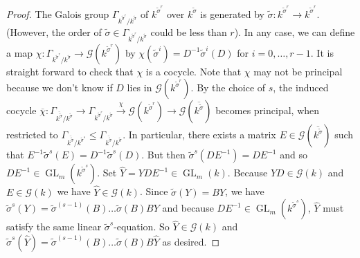 \documentclass[oneside,reqno]{amsart}
\theoremstyle{definition}
\newcommand{\G}{\mathcal{G}}
\newcommand{\Gl}{\operatorname{GL}}
\newcommand{\s}{\sigma}
\begin{document}
\begin{proof}
The Galois group %
$\Gamma_{k^{{\tilde\s}^r}/k^{\tilde\s}}$ of $k^{{\tilde \s}^r}$ over $ k^{\tilde \s}$ is generated by $\tilde{\s}\colon k^{{\tilde \s}^r}\to k^{{\tilde \s}^r}$. (However, the order of $\tilde{\s}\in \Gamma_{k^{{\tilde\s}^r}/k^{\tilde\s}}$ could be less than $r$). In any case, we can define a map $\chi\colon \Gamma_{k^{{\tilde\s}^r}/k^{\tilde\s}}\to \G( k^{\tilde \s^r})$ by $\chi(\tilde \s^i)=D^{-1}\tilde \s^i(D)$ for $i=0,\ldots,{r-1}$. It is straight forward to check that $\chi$ is a cocycle. Note that $\chi$ may not be principal because we don't know if $D$ lies in $\G( k^{\tilde \s^r})$. By the choice of $s$, the induced cocycle $\overline{\chi}\colon \Gamma_{\overline{k^{{\tilde\s}}}/k^{\tilde\s}}\to \Gamma_{k^{{\tilde\s}^r}/k^{\tilde\s}}\xrightarrow{\chi} \G( k^{\tilde \s^r})\to  \G(\overline{k^{\tilde \s}})$ becomes principal, when restricted to $\Gamma_{\overline{k^{{\tilde\s}}}/k^{\tilde\s^s}}\leq\Gamma_{\overline{k^{{\tilde\s}}}/k^{\tilde\s}}$. In particular, there exists a matrix $E\in \G(\overline{k^{\tilde \s}})$ such that $E^{-1}\tilde\s^s(E)=D^{-1}\tilde\s^s(D)$. But then $\tilde\s^s(DE^{-1})=DE^{-1}$ and so $DE^{-1}\in\Gl_m(k^{\tilde \s^s})$.
Set $\hat Y=YDE^{-1}\in \Gl_m(k)$. Because $YD\in\G(k)$ and $E\in\G(k)$ we have $\hat Y\in \G(k)$. Since $\tilde\s(Y)=BY$, we have $\tilde\s^s(Y)=\tilde\s^{(s-1)}(B)\ldots\tilde\s(B)BY$ and because  $DE^{-1}\in\Gl_m(k^{\tilde \s^s})$, $\hat Y$ must satisfy the same linear $\tilde\s^s$-equation. So $\hat Y\in\G(k)$ and $\tilde\s^s(\hat Y)=\tilde\s^{(s-1)}(B)\ldots\tilde\s(B)B\hat Y$ as desired.
%
% 
\end{proof}
\end{document}
